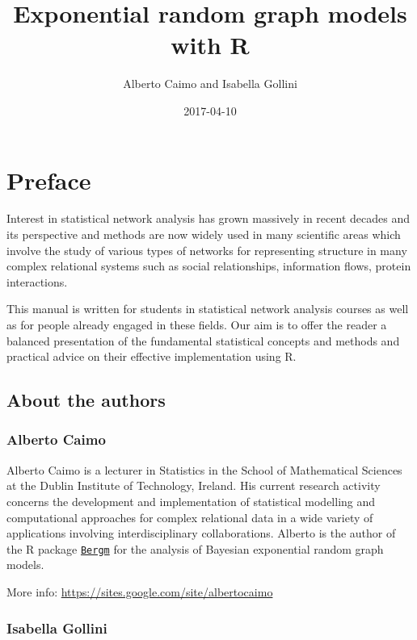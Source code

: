 \documentclass[]{book}
\title{Exponential random graph models with R}
\author{Alberto Caimo and Isabella Gollini}
\date{2017-04-10}
\begin{document}
\maketitle

{
\setcounter{tocdepth}{1}
\tableofcontents
}
\chapter*{Preface}\label{preface}

Interest in statistical network analysis has grown massively in recent
decades and its perspective and methods are now widely used in many
scientific areas which involve the study of various types of networks
for representing structure in many complex relational systems such as
social relationships, information flows, protein interactions.

This manual is written for students in statistical network analysis
courses as well as for people already engaged in these fields. Our aim
is to offer the reader a balanced presentation of the fundamental
statistical concepts and methods and practical advice on their effective
implementation using R.

\section*{About the authors}\label{about-the-authors}

\subsection*{Alberto Caimo}\label{alberto-caimo}

Alberto Caimo is a lecturer in Statistics in the School of Mathematical
Sciences at the Dublin Institute of Technology, Ireland. His current
research activity concerns the development and implementation of
statistical modelling and computational approaches for complex
relational data in a wide variety of applications involving
interdisciplinary collaborations. Alberto is the author of the R package
\href{https://CRAN.R-project.org/package=Bergm}{\texttt{Bergm}} for the
analysis of Bayesian exponential random graph models.

More info:
\href{https://sites.google.com/site/albertocaimo/}{https://sites.google.com/site/albertocaimo}

\subsection*{Isabella Gollini}\label{isabella-gollini}
\end{document}
